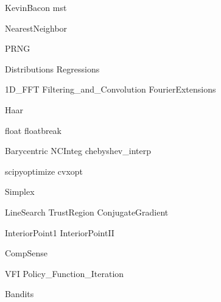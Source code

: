 \documentclass[nociteref]{SIAM-GH-book}
\begin{document}
{KevinBacon}
{mst}

{NearestNeighbor}

{PRNG}

{Distributions}
{Regressions}

{1D_FFT}
{Filtering_and_Convolution}
{FourierExtensions}

{Haar}

{float}
{floatbreak}

{Barycentric}
{NCInteg}
{chebyshev_interp}


{scipyoptimize}
{cvxopt}

{Simplex}


{LineSearch}
{TrustRegion}
{ConjugateGradient}

{InteriorPoint1}
{InteriorPointII}


{CompSense}

{VFI}
{Policy_Function_Iteration}

{Bandits}
\end{document}
